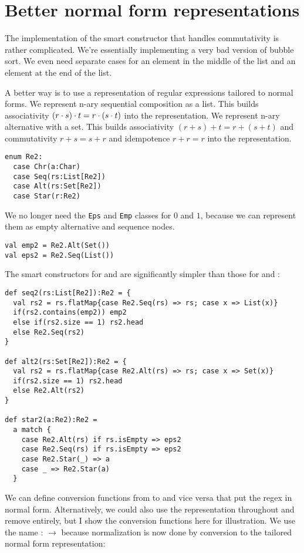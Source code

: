 \section{Better normal form representations}

The implementation of the smart constructor that handles commutativity is rather complicated. We're essentially implementing a very bad version of bubble sort. We even need separate cases for an element in the middle of the list and an element at the end of the list.

A better way is to use a representation of regular expressions tailored to normal forms. We represent n-ary sequential composition as a list. This builds associativity $(r \cdot s) \cdot t = r \cdot (s \cdot t)$ into the representation. We represent n-ary alternative with a set. This builds associativity $(r + s) + t = r + (s + t)$ and commutativity $r + s = s + r$ and idempotence $r + r = r$ into the representation.

\begin{lstlisting}
enum Re2:
  case Chr(a:Char)
  case Seq(rs:List[Re2])
  case Alt(rs:Set[Re2])
  case Star(r:Re2)
\end{lstlisting}

We no longer need the \lstinline|Eps| and \lstinline|Emp| classes for $0$ and $1$, because we can represent them as empty alternative and sequence nodes.

\begin{lstlisting}
val emp2 = Re2.Alt(Set())
val eps2 = Re2.Seq(List())
\end{lstlisting}

The smart constructors for  and  are significantly simpler than those for  and :

\begin{lstlisting}
def seq2(rs:List[Re2]):Re2 = {
  val rs2 = rs.flatMap{case Re2.Seq(rs) => rs; case x => List(x)}
  if(rs2.contains(emp2)) emp2
  else if(rs2.size == 1) rs2.head
  else Re2.Seq(rs2)
}

def alt2(rs:Set[Re2]):Re2 = {
  val rs2 = rs.flatMap{case Re2.Alt(rs) => rs; case x => Set(x)}
  if(rs2.size == 1) rs2.head
  else Re2.Alt(rs2)
}

def star2(a:Re2):Re2 =
  a match {
    case Re2.Alt(rs) if rs.isEmpty => eps2
    case Re2.Seq(rs) if rs.isEmpty => eps2
    case Re2.Star(_) => a
    case _ => Re2.Star(a)
  }
\end{lstlisting}

We can define conversion functions from  to  and vice versa that put the regex in normal form.
Alternatively, we could also use the  representation throughout and remove  entirely, but I show the conversion functions here for illustration.
We use the name  :  $\to$  because normalization is now done by conversion to the tailored normal form representation:

